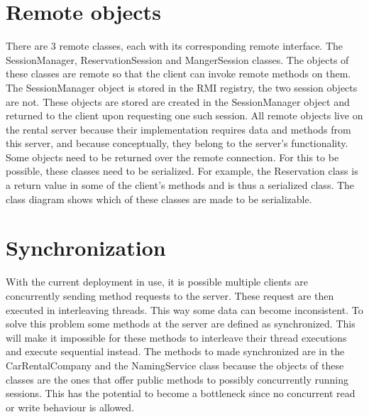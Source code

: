 \documentclass[]{article}
\begin{document}
\section{Remote objects}
There are 3 remote classes, each with its corresponding remote interface. The SessionManager, ReservationSession and MangerSession classes. The objects of these classes are remote so that the client can invoke remote methods on them. The SessionManager object is stored in the RMI registry, the two session objects are not. These objects are stored are created in the SessionManager object and returned to the client upon requesting one such session. All remote objects live on the rental server because their implementation requires data and methods from this server, and because conceptually, they belong to the server's functionality.
\\
Some objects need to be returned over the remote connection. For this to be possible, these classes need to be serialized. For example, the Reservation class is a return value in some of the client's methods and is thus a serialized class. The class diagram shows which of these classes are made to be serializable.  

\section{Synchronization}
With the current deployment in use, it is possible multiple clients are concurrently sending method requests to the server. These request are then executed in interleaving threads. This way some data can become inconsistent. To solve this problem some methods at the server are defined as synchronized. This will make it impossible for these methods to interleave their thread executions and execute sequential instead. The methods to made synchronized are in the CarRentalCompany and the NamingService class because the objects of these classes are the ones that offer public methods to possibly concurrently running sessions. This has the potential to become a bottleneck since no concurrent read or write behaviour is allowed.
\clearpage
\end{document}
